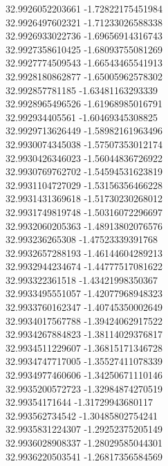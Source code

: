 {32.9926052203661	-1.72822175451984\\
32.9926497602321	-1.71233026588338\\
32.9926933022736	-1.69656914316743\\
32.9927358610425	-1.68093755081269\\
32.9927774509543	-1.66543465541913\\
32.9928180862877	-1.65005962578302\\
32.992857781185	-1.63481163293339\\
32.9928965496526	-1.61968985016791\\
32.992934405561	-1.60469345308825\\
32.9929713626449	-1.58982161963496\\
32.9930074345038	-1.57507353012174\\
32.9930426346023	-1.56044836726922\\
32.9930769762702	-1.54594531623819\\
32.9931104727029	-1.53156356466228\\
32.9931431369618	-1.51730230268012\\
32.9931749819748	-1.50316072296697\\
32.9932060205363	-1.48913802076576\\
32.993236265308	-1.47523339391768\\
32.9932657288193	-1.46144604289213\\
32.9932944234674	-1.44777517081622\\
32.993322361518	-1.43421998350367\\
32.9933495551057	-1.42077968948323\\
32.9933760162347	-1.40745350002649\\
32.9934017567788	-1.39424062917522\\
32.9934267884823	-1.38114029376817\\
32.9934511229607	-1.36815171346728\\
32.9934747717005	-1.35527411078339\\
32.9934977460606	-1.34250671110146\\
32.9935200572723	-1.32984874270519\\
32.99354171644	-1.31729943680117\\
32.993562734542	-1.30485802754241\\
32.9935831224307	-1.29252375205149\\
32.9936028908337	-1.28029585044301\\
32.9936220503541	-1.26817356584569\\
}

